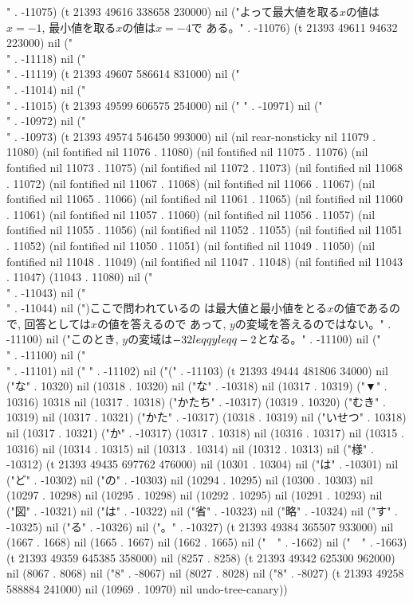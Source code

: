 " . -11075) (t 21393 49616 338658 230000) nil ("よって最大値を取る$x$の値は$x=-1$, 最小値を取る$x$の値は$x=-4$で
ある。" . -11076) (t 21393 49611 94632 223000) nil ("\\" . -11118) nil ("\\" . -11119) (t 21393 49607 586614 831000) nil ("\\" . -11014) nil ("\\" . -11015) (t 21393 49599 606575 254000) nil ("
" . -10971) nil ("\\" . -10972) nil ("\\" . -10973) (t 21393 49574 546450 993000) nil (nil rear-nonsticky nil 11079 . 11080) (nil fontified nil 11076 . 11080) (nil fontified nil 11075 . 11076) (nil fontified nil 11073 . 11075) (nil fontified nil 11072 . 11073) (nil fontified nil 11068 . 11072) (nil fontified nil 11067 . 11068) (nil fontified nil 11066 . 11067) (nil fontified nil 11065 . 11066) (nil fontified nil 11061 . 11065) (nil fontified nil 11060 . 11061) (nil fontified nil 11057 . 11060) (nil fontified nil 11056 . 11057) (nil fontified nil 11055 . 11056) (nil fontified nil 11052 . 11055) (nil fontified nil 11051 . 11052) (nil fontified nil 11050 . 11051) (nil fontified nil 11049 . 11050) (nil fontified nil 11048 . 11049) (nil fontified nil 11047 . 11048) (nil fontified nil 11043 . 11047) (11043 . 11080) nil ("\\" . -11043) nil ("\\" . -11044) nil (")ここで問われているの
は最大値と最小値をとる$x$の値であるので, 回答としては$x$の値を答えるので
あって, $y$の変域を答えるのではない。" . -11100) nil ("このとき, $y$の変域は$-32\\leqq y\\leqq -2$となる。" . -11100) nil ("\\" . -11100) nil ("\\" . -11101) nil ("
" . -11102) nil ("(" . -11103) (t 21393 49444 481806 34000) nil ("な" . 10320) nil (10318 . 10320) nil ("な" . -10318) nil (10317 . 10319) ("▼" . 10316) 10318 nil (10317 . 10318) ("かたち" . -10317) (10319 . 10320) ("むき" . 10319) nil (10317 . 10321) ("かた" . -10317) (10318 . 10319) nil ("いせつ" . 10318) nil (10317 . 10321) ("か" . -10317) (10317 . 10318) nil (10316 . 10317) nil (10315 . 10316) nil (10314 . 10315) nil (10313 . 10314) nil (10312 . 10313) nil ("様" . -10312) (t 21393 49435 697762 476000) nil (10301 . 10304) nil ("は" . -10301) nil ("ど" . -10302) nil ("の" . -10303) nil (10294 . 10295) nil (10300 . 10303) nil (10297 . 10298) nil (10295 . 10298) nil (10292 . 10295) nil (10291 . 10293) nil ("図" . -10321) nil ("は" . -10322) nil ("省" . -10323) nil ("略" . -10324) nil ("す" . -10325) nil ("る" . -10326) nil ("。" . -10327) (t 21393 49384 365507 933000) nil (1667 . 1668) nil (1665 . 1667) nil (1662 . 1665) nil ("　" . -1662) nil ("　" . -1663) (t 21393 49359 645385 358000) nil (8257 . 8258) (t 21393 49342 625300 962000) nil (8067 . 8068) nil ("8" . -8067) nil (8027 . 8028) nil ("8" . -8027) (t 21393 49258 588884 241000) nil (10969 . 10970) nil undo-tree-canary))
